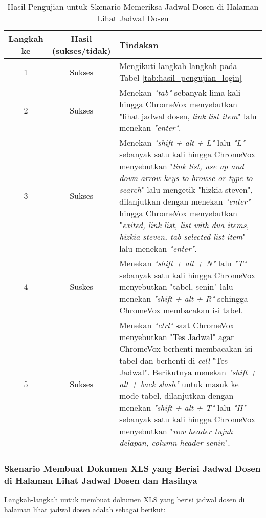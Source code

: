 \begin{table}[H]
    \centering 
    \caption{Hasil Pengujian untuk Skenario Memeriksa Jadwal Dosen di Halaman Lihat Jadwal Dosen}
    \label{tab:hasil_pengujian_memeriksa_jadwal_dosen_di_halaman_lihat_jadwal_dosen}
    \begin{tabular}{|c|c|p{10cm}|}
        \toprule
        Langkah ke & Hasil (sukses/tidak) & Tindakan \\

        \midrule
        1 & Sukses & Mengikuti langkah-langkah pada Tabel \ref{tab:hasil_pengujian_login} \\
        2 & Sukses & Menekan \textit{"tab"} sebanyak lima kali hingga ChromeVox menyebutkan "lihat jadwal dosen, \textit{link list item}" lalu menekan \textit{"enter"}. \\
        3 & Sukses & Menekan \textit{"shift + alt + L"} lalu \textit{"L"} sebanyak satu kali hingga ChromeVox menyebutkan "\textit{link list, use up and down arrow keys to browse or type to search}" lalu mengetik "hizkia steven", dilanjutkan dengan menekan \textit{"enter"} hingga ChromeVox menyebutkan "\textit{exited, link list, list with dua items, hizkia steven, tab selected list item}" lalu menekan \textit{"enter"}. \\
        4 & Suskes & Menekan \textit{"shift + alt + N"} lalu \textit{"T"} sebanyak satu kali hingga ChromeVox menyebutkan "tabel, senin" lalu menekan \textit{"shift + alt + R"} sehingga ChromeVox membacakan isi tabel. \\
        5 & Sukses & Menekan \textit{"ctrl"} saat ChromeVox menyebutkan "Tes Jadwal" agar ChromeVox berhenti membacakan isi tabel dan berhenti di \textit{cell} "Tes Jadwal". Berikutnya menekan \textit{"shift + alt + back slash"} untuk masuk ke mode tabel, dilanjutkan dengan menekan \textit{"shift + alt + T"} lalu \textit{"H"} sebanyak satu kali hingga ChromeVox menyebutkan "\textit{row header tujuh delapan, column header senin}". \\

        \bottomrule

    \end{tabular}
\end{table}

\subsubsection{Skenario Membuat Dokumen XLS yang Berisi Jadwal Dosen di Halaman Lihat Jadwal Dosen dan Hasilnya}
\label{subsubsec:skenario_membuat_dokumen_xls_yang_berisi_jadwal_dosen_di_halaman_lihat_jadwal_dosen}
Langkah-langkah untuk membuat dokumen XLS yang berisi jadwal dosen di halaman lihat jadwal dosen adalah sebagai berikut:

